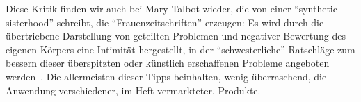 
Diese Kritik finden wir auch bei Mary Talbot wieder, die von einer ``synthetic sisterhood'' schreibt, die ``Frauenzeitschriften'' erzeugen:
Es wird durch die übertriebene Darstellung von geteilten Problemen und negativer Bewertung des eigenen Körpers eine Intimität hergestellt, in der ``schwesterliche'' Ratschläge zum bessern dieser überspitzten oder künstlich erschaffenen Probleme angeboten werden~\cite{Talbot95}.
Die allermeisten dieser Tipps beinhalten, wenig überraschend, die Anwendung verschiedener, im Heft vermarkteter, Produkte.


\begin{comment}
Man kann die oben anlautende Kritik erweitern/weiter denken/verfolgen/... und ... daran anknüpfen:
Schlussendlich sind die hier erweckten/angedeuteten/.. Werte wie Flexibilität, (hip, jung), Mobilität, Kreativität, .. vom Kapitalismus aufgegriffen und angeeignet worden.



Eine weitere spannende Kategorie habe ich ``one night stand'' bzw Sachen, die mit Sex zu tun haben benannt.
Wir kennen den platten Ausdruck ``sex sells'' und die kapitalistische Gesellschaft tut Frauen gnadenlos als sexualisierte Objekte ausbeuten (besser ausführen, nach Kapitalismuskritik).
Warum aber werden Wörter und Ausdrücke aus diesem semantischen Feld auf Englisch gebraucht?
Ich würde hier wieder das Argument mit der Prestige, bzw coolness heranziehen. (vgl auch Laurie Penny!)
\end{comment}


\begin{comment}
Eckert:

``Once the agent isolates and attributes significance to a feature, that feautre becomes a resource that he or she can incorporate or not into his or her own style.''
--> Switching is identified as a resource by the publishers of the magazine

1st order indexicality/Indizes
Latinas

2nd order
bewusste Nutzung von bilingualen Codes von den Herausgeberinnen um sich als Latinas zu positionieren und diese anzusprechen; eine Sisterhood zu simulieren

3rd order
social mobility/prestige?
\end{comment}


